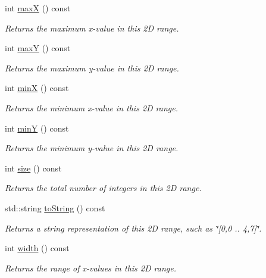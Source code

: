 \begin{DoxyCompactItemize}
int \mbox{\hyperlink{classIntRange2D_aa9493e60175cb4e130ae4cfba2b55907}{maxX}} () const
\begin{DoxyCompactList}\small\item\em Returns the maximum x-\/value in this 2D range. \end{DoxyCompactList}\item 
int \mbox{\hyperlink{classIntRange2D_a015dcf4989cbafff40d5a345b9d9f959}{maxY}} () const
\begin{DoxyCompactList}\small\item\em Returns the maximum y-\/value in this 2D range. \end{DoxyCompactList}\item 
int \mbox{\hyperlink{classIntRange2D_a1a1724b4b31e3d3d251e5816c7d9e448}{minX}} () const
\begin{DoxyCompactList}\small\item\em Returns the minimum x-\/value in this 2D range. \end{DoxyCompactList}\item 
int \mbox{\hyperlink{classIntRange2D_a2337641dec44ff553785d9c143c3aafd}{minY}} () const
\begin{DoxyCompactList}\small\item\em Returns the minimum y-\/value in this 2D range. \end{DoxyCompactList}\item 
int \mbox{\hyperlink{classIntRange2D_af9593d4a5ff4274efaf429cb4f9e57cc}{size}} () const
\begin{DoxyCompactList}\small\item\em Returns the total number of integers in this 2D range. \end{DoxyCompactList}\item 
std\+::string \mbox{\hyperlink{classIntRange2D_a1fe5121d6528fdea3f243321b3fa3a49}{to\+String}} () const
\begin{DoxyCompactList}\small\item\em Returns a string representation of this 2D range, such as \char`\"{}\mbox{[}0,0 .. 4,7\mbox{]}\char`\"{}. \end{DoxyCompactList}\item 
int \mbox{\hyperlink{classIntRange2D_ad72663daf610f2a0833a2fc3d78e4fdf}{width}} () const
\begin{DoxyCompactList}\small\item\em Returns the range of x-\/values in this 2D range. \end{DoxyCompactList}\end{DoxyCompactItemize}


